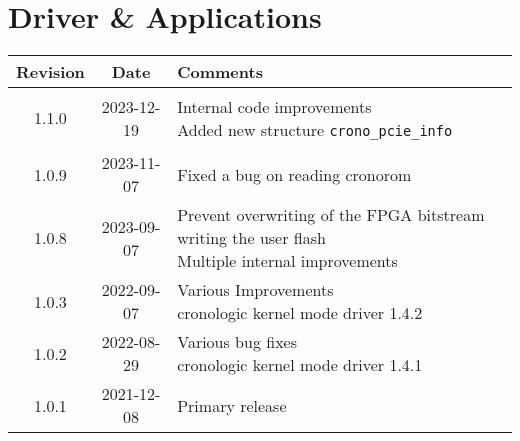 \section{Driver \& Applications}
\begin{tabularx}{\textwidth}{|c|c|X|}
    \hline
    Revision & Date & Comments\\
    \hline\hline
    \hypertarget{drvrev}{1.1.0} & 2023-12-19 &
    \makecell[l]{
        Internal code improvements\\*
        Added new structure \texttt{crono\_pcie\_info}
    }\\
    \hline
    1.0.9 & 2023-11-07 & Fixed a bug on reading cronorom   \\
    \hline
    1.0.8 & 2023-09-07 &
    \makecell[l]{
        Prevent overwriting of the FPGA bitstream writing the user flash\\*
        Multiple internal improvements
    }\\
    \hline
    1.0.3 & 2022-09-07 &
    \makecell[l]{
        Various Improvements\\*
        cronologic kernel mode driver 1.4.2
    }\\
    \hline
    1.0.2 & 2022-08-29 &
    \makecell[l]{
        Various bug fixes\\*
        cronologic kernel mode driver 1.4.1
    }\\
    \hline
    1.0.1 & 2021-12-08 & Primary release\\
    \hline
\end{tabularx}